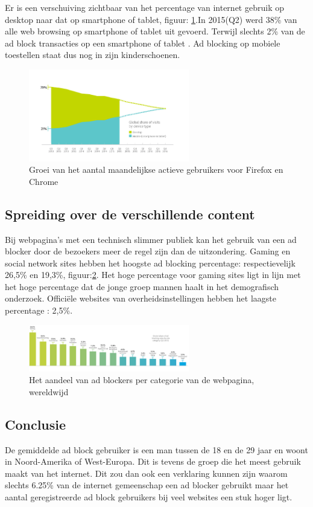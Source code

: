 \documentclass[pdftex,a4paper,12pt,twoside]{report}
\begin{document}
Er is een verschuiving zichtbaar van het percentage van internet gebruik op desktop naar dat op smartphone of tablet, figuur: \ref{fig: MobileVsDeskotpInternet}.In 2015(Q2) werd 38\% van alle web browsing op smartphone of tablet uit gevoerd. Terwijl slechts 2\% van de ad block transacties op een smartphone of tablet \cite{PageFair2015}.
Ad blocking op mobiele toestellen staat dus nog in zijn kinderschoenen.

\begin{figure}[h!]
\centering
\includegraphics[width=7cm]{img/MobileVsDeskotpInternet}
\caption{Groei van het aantal maandelijkse actieve gebruikers voor Firefox en Chrome}
\label{fig: MobileVsDeskotpInternet}
\end{figure}

\subsection{Spreiding over de verschillende content}
\label{sec Spreiding over de verschillende content}
Bij webpagina's met een technisch slimmer publiek kan het gebruik van een ad blocker door de bezoekers meer de regel zijn dan de uitzondering. Gaming en social network sites hebben het hoogste ad blocking percentage: respectievelijk 26,5\% en 19,3\%, figuur:\ref{fig: percontent}. Het hoge percentage voor gaming sites ligt in lijn met het hoge percentage dat de jonge groep mannen haalt in het demografisch onderzoek. Officiële websites van overheidsinstellingen hebben het laagste percentage : 2,5\%.

\begin{figure}[h!]
\centering
\includegraphics[width=7cm]{img/percontent}
\caption{Het aandeel van ad blockers per categorie van de webpagina, wereldwijd}
\label{fig: percontent}
\end{figure}

\subsection{Conclusie}
\label{sec Conclusie}
De gemiddelde ad block gebruiker is een man tussen de 18 en de 29 jaar en woont in Noord-Amerika of West-Europa. Dit is tevens de groep die het meest gebruik maakt van het internet. Dit zou dan ook een verklaring kunnen zijn waarom slechts 6.25\% van de internet gemeenschap een ad blocker gebruikt maar het aantal geregistreerde ad block gebruikers bij veel websites een stuk hoger ligt.%
\end{document}

